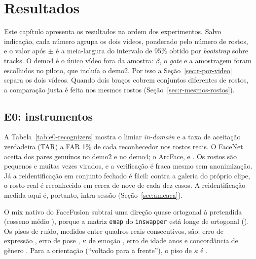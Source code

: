 \chapter{Resultados}
\label{cap:resultados}


Este capítulo apresenta os resultados na ordem dos experimentos. Salvo indicação, cada número agrupa os dois vídeos, ponderado pelo número de rostos, e o valor após $\pm$ é a meia-largura do intervalo de 95\% obtido por \emph{bootstrap} sobre tracks. O demo4 é o único vídeo fora da amostra: $\beta$, o \emph{gate} e a amostragem foram escolhidos no piloto, que incluía o demo2. Por isso a Seção~\ref{sec:r-por-video} separa os dois vídeos. Quando dois braços cobrem conjuntos diferentes de rostos, a comparação justa é feita nos mesmos rostos (Seção~\ref{sec:r-mesmos-rostos}).

\section{E0: instrumentos}

A Tabela~\ref{tab:e0-recognizers} mostra o limiar \emph{in-domain} e a taxa de aceitação verdadeira (TAR) a FAR 1\% de cada reconhecedor nos rostos reais. O FaceNet aceita  dos pares genuínos no demo2 e  no demo4; o ArcFace,  e . Os rostos são pequenos e muitas vezes virados, e a verificação é fraca mesmo sem anonimização. Já a reidentificação em conjunto fechado é fácil: contra a galeria do próprio clipe, o rosto real é reconhecido em cerca de nove de cada dez casos. A reidentificação medida aqui é, portanto, intra-sessão (Seção~\ref{sec:ameaca}).

O mix nativo do FaceFusion subtrai uma direção quase ortogonal à pretendida (cosseno médio ), porque a matriz \texttt{emap} do \texttt{inswapper} está longe de ortogonal (). Os pisos de ruído, medidos entre quadros reais consecutivos, são: erro de expressão , erro de pose \textdegree, $\kappa$ de emoção , erro de idade  anos e concordância de gênero . Para a orientação (``voltado para a frente''), o piso de $\kappa$ é .

